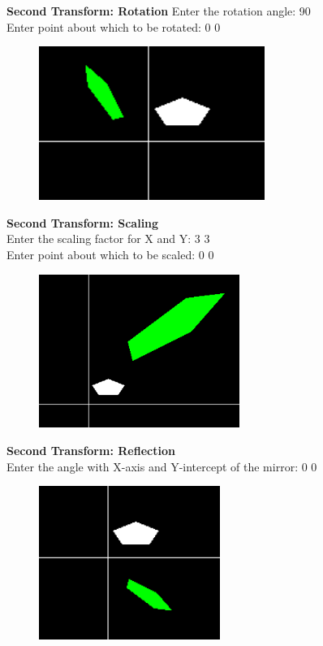 \documentclass[9pt,letterpaper]{article}
\begin{document}
\newpage

\textbf{\large{Second Transform: Rotation}}
Enter the rotation angle: 90\\
Enter point about which to be rotated: 0 0\\

\begin{figure}[h]
    \centering
    \includegraphics[height=5cm]{CompositeTransformations/Outputs/ShearRotate.png}
\end{figure}

\textbf{\large{Second Transform: Scaling}}\\
Enter the scaling factor for X and Y: 3 3\\
Enter point about which to be scaled: 0 0\\

\begin{figure}[h]
    \centering
    \includegraphics[height=5cm]{CompositeTransformations/Outputs/ShearScale.png}
\end{figure}

\newpage

\textbf{\large{Second Transform: Reflection}}\\
Enter the angle with X-axis and Y-intercept of the mirror: 0 0\\

\begin{figure}[h]
    \centering
    \includegraphics[height=5cm]{CompositeTransformations/Outputs/ShearReflect.png}
\end{figure}
\end{document}
